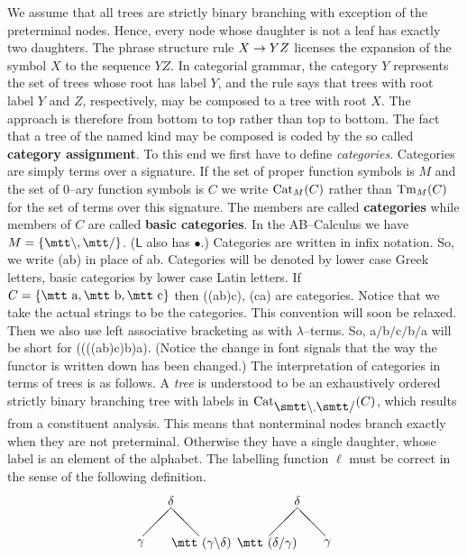 We assume  that all trees are strictly binary branching with
exception of the preterminal nodes. Hence, every node whose
daughter is not a leaf has exactly two daughters. The phrase
structure rule $X \rightarrow Y Z$ licenses the expansion of the symbol 
$X$ to the sequence $YZ$.  In categorial grammar, the category 
$Y$ represents the set of trees whose root has label $Y$, and 
the rule says that trees with root label $Y$ and $Z$, respectively, 
may be composed to a tree with root $X$. The approach is therefore 
from bottom to top rather than top to bottom. The fact that a tree 
of the named kind may be composed is coded by the so called
\textbf{category assignment}. To this end we first have to define
{\it categories}. Categories are simply terms over a signature.
If the set of proper function symbols is $M$ and the set of 
0--ary function symbols is $C$ we write $\operatorname{Cat}_M(C)$ 
rather than $\operatorname{Tm}_M(C)$ for the set of terms over this 
signature. The members are called \textbf{categories}
while members of $C$ are called \textbf{basic categories}. %
In the AB--Calculus we have $M = \{\mbox{\mtt\tb}, %
\mbox{\mtt\tf}\}$. ($\mathsf{L}$ also has $\bullet$.) Categories 
are written in infix notation. So, we write {\mtt (a{\tf}b)} in 
place of {\mtt {\tf}ab}. Categories will be denoted by lower 
case Greek letters, basic categories by lower case Latin letters. 
If $C = \{\mbox{\mtt a}, \mbox{\mtt b}, \mbox{\mtt c}\}$ then 
{\mtt ((a{\tf}b){\tb}c)}, {\mtt (c{\tf}a)} are categories. 
Notice that we take the actual strings to be the categories. 
This convention will soon be relaxed. Then we also use left 
associative bracketing as with $\lambda$--terms. So, 
{\mtt a$/$b$/$c$/$b$/$a} will be short for
{\mtt ((((a{\tf}b){\tf}c){\tf}b){\tf}a)}. (Notice the change 
in font signals that the way the functor is written down has 
been changed.) The interpretation of categories in terms of 
trees is as follows.  A {\it tree\/} is understood to be an 
exhaustively ordered strictly binary branching tree with labels in 
$\Cat_{\mbox{\smtt\tb}, \mbox{\smtt\tf}}(C)$, which 
results from a constituent analysis. This means that nonterminal 
nodes branch exactly when
they are not preterminal. Otherwise they have a single daughter, 
whose label is an element of the alphabet. The labelling function 
$\ell$ must be correct in the sense of the following definition.
\begin{equation}
\begin{array}{l}
\binbaum{\delta}{\gamma}{\mbox{\mtt ($\gamma${\tb}$\delta$)}}
\qquad
\binbaum{\delta}{\mbox{\mtt ($\delta${\tf}$\gamma$)}}{\gamma}
\end{array}
\end{equation}
